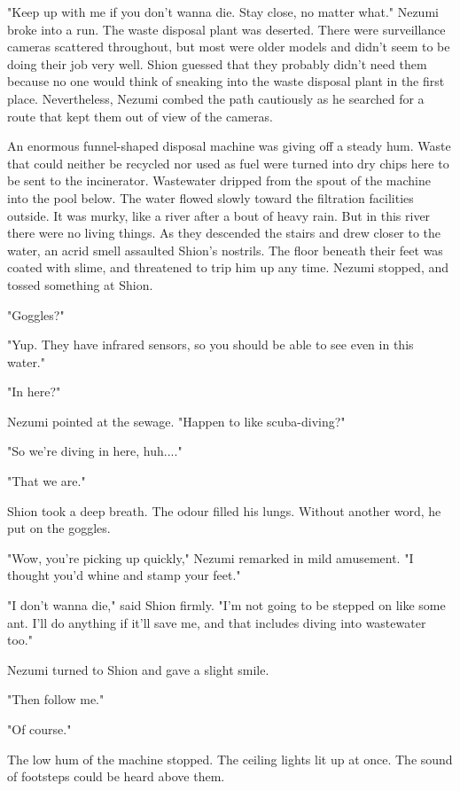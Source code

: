 "Keep up with me if you don't wanna die. Stay close, no matter what."
Nezumi broke into a run. The waste disposal plant was deserted. There
were surveillance cameras scattered throughout, but most were older
models and didn't seem to be doing their job very well. Shion guessed
that they probably didn't need them because no one would think of
sneaking into the waste disposal plant in the first place. Nevertheless,
Nezumi combed the path cautiously as he searched for a route that kept
them out of view of the cameras.

An enormous funnel-shaped disposal machine was giving off a steady hum.
Waste that could neither be recycled nor used as fuel were turned into
dry chips here to be sent to the incinerator. Wastewater dripped from
the spout of the machine into the pool below. The water flowed slowly
toward the filtration facilities outside. It was murky, like a river
after a bout of heavy rain. But in this river there were no living
things. As they descended the stairs and drew closer to the water, an
acrid smell assaulted Shion's nostrils. The floor beneath their feet was
coated with slime, and threatened to trip him up any time. Nezumi
stopped, and tossed something at Shion.

"Goggles?"

"Yup. They have infrared sensors, so you should be able to see even in
this water."

"In here?"

Nezumi pointed at the sewage. "Happen to like scuba-diving?"

"So we're diving in here, huh...."

"That we are."

Shion took a deep breath. The odour filled his lungs. Without another
word, he put on the goggles.

"Wow, you're picking up quickly," Nezumi remarked in mild amusement. "I
thought you'd whine and stamp your feet."

"I don't wanna die," said Shion firmly. "I'm not going to be stepped on
like some ant. I'll do anything if it'll save me, and that includes
diving into wastewater too."

Nezumi turned to Shion and gave a slight smile.

"Then follow me."

"Of course."

The low hum of the machine stopped. The ceiling lights lit up at once.
The sound of footsteps could be heard above them.

